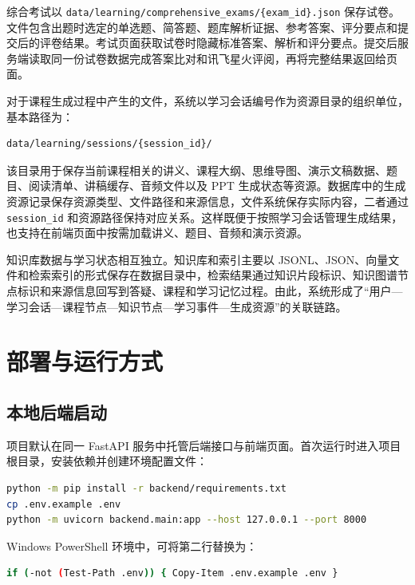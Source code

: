 综合考试以 \texttt{data/learning/comprehensive\_exams/\{exam\_id\}.json} 保存试卷。文件包含出题时选定的单选题、简答题、题库解析证据、参考答案、评分要点和提交后的评卷结果。考试页面获取试卷时隐藏标准答案、解析和评分要点。提交后服务端读取同一份试卷数据完成答案比对和讯飞星火评阅，再将完整结果返回给页面。

对于课程生成过程中产生的文件，系统以学习会话编号作为资源目录的组织单位，基本路径为：

\begin{lstlisting}
data/learning/sessions/{session_id}/
\end{lstlisting}

该目录用于保存当前课程相关的讲义、课程大纲、思维导图、演示文稿数据、题目、阅读清单、讲稿缓存、音频文件以及 PPT 生成状态等资源。数据库中的生成资源记录保存资源类型、文件路径和来源信息，文件系统保存实际内容，二者通过 \texttt{session\_id} 和资源路径保持对应关系。这样既便于按照学习会话管理生成结果，也支持在前端页面中按需加载讲义、题目、音频和演示资源。

知识库数据与学习状态相互独立。知识库和索引主要以 JSONL、JSON、向量文件和检索索引的形式保存在数据目录中，检索结果通过知识片段标识、知识图谱节点标识和来源信息回写到答疑、课程和学习记忆过程。由此，系统形成了“用户—学习会话—课程节点—知识节点—学习事件—生成资源”的关联链路。

\section{部署与运行方式}

\subsection{本地后端启动}

项目默认在同一 FastAPI 服务中托管后端接口与前端页面。首次运行时进入项目根目录，安装依赖并创建环境配置文件：

\begin{lstlisting}[language=bash,caption={后端本地启动命令},label={lst:backend-start}]
python -m pip install -r backend/requirements.txt
cp .env.example .env
python -m uvicorn backend.main:app --host 127.0.0.1 --port 8000
\end{lstlisting}

Windows PowerShell 环境中，可将第二行替换为：

\begin{lstlisting}[language=bash]
if (-not (Test-Path .env)) { Copy-Item .env.example .env }
\end{lstlisting}

